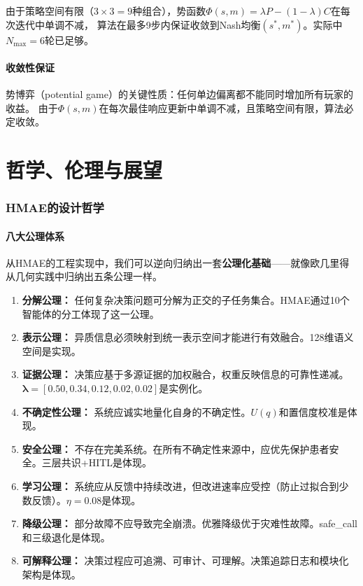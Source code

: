 \documentclass[11pt,a4paper]{ctexart}
\begin{document}
由于策略空间有限（$3 \times 3 = 9$种组合），势函数$\Phi(s,m) = \lambda P - (1-\lambda)C$在每次迭代中单调不减，
算法在最多9步内保证收敛到Nash均衡$(s^*, m^*)$。实际中$N_{\max}=6$轮已足够。

\subsection{收敛性保证}

势博弈（potential game）的关键性质：任何单边偏离都不能同时增加所有玩家的收益。
由于$\Phi(s,m)$在每次最佳响应更新中单调不减，且策略空间有限，算法必定收敛。

\newpage

\part{哲学、伦理与展望}\vspace{18pt}

\section{HMAE的设计哲学}

\subsection{八大公理体系}

从HMAE的工程实现中，我们可以逆向归纳出一套\textbf{公理化基础}——就像欧几里得从几何实践中归纳出五条公理一样。

\begin{enumerate}[nosep]
\item \textbf{分解公理：} 任何复杂决策问题可分解为正交的子任务集合。HMAE通过10个智能体的分工体现了这一公理。
\item \textbf{表示公理：} 异质信息必须映射到统一表示空间才能进行有效融合。128维语义空间是实现。
\item \textbf{证据公理：} 决策应基于多源证据的加权融合，权重反映信息的可靠性递减。$\boldsymbol{\lambda} = [0.50, 0.34, 0.12, 0.02, 0.02]$是实例化。
\item \textbf{不确定性公理：} 系统应诚实地量化自身的不确定性。$U(q)$和置信度校准是体现。
\item \textbf{安全公理：} 不存在完美系统。在所有不确定性来源中，应优先保护患者安全。三层共识+HITL是体现。
\item \textbf{学习公理：} 系统应从反馈中持续改进，但改进速率应受控（防止过拟合到少数反馈）。$\eta=0.08$是体现。
\item \textbf{降级公理：} 部分故障不应导致完全崩溃。优雅降级优于灾难性故障。safe\_call和三级退化是体现。
\item \textbf{可解释公理：} 决策过程应可追溯、可审计、可理解。决策追踪日志和模块化架构是体现。
\end{enumerate}
\end{document}
